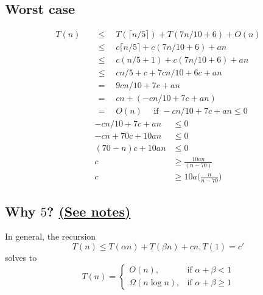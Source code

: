 \documentclass[a4paper]{article}
\begin{document}
\subsection*{Worst case}
    \begin{align*}
        T(n)\quad&\leq \quad T(\lceil n/5\rceil)+T(7n/10+6)+O(n)\\
        &\leq \quad c\lceil n/5\rceil+c(7n/10+6)+an\\
        &\leq \quad c(n/5+1)+c(7n/10+6)+an\\
        &\leq \quad cn/5+c+7cn/10+6c+an\\
        &=\quad 9cn/10+7c+an\\
        &=\quad cn+(-cn/10+7c+an)\\
        &=\quad O(n)\quad \text{ if }-cn/10+7c+an\leq 0
    \end{align*}
    \begin{align*}
        -cn/10+7c+an&\leq 0\\
        -cn+70c+10an&\leq 0\\
        (70-n)c+10an&\leq 0\\
        c&\geq \frac{10an}{(n-70)}\\
        c&\geq 10a\Big(\frac{n}{n-70}\Big)
    \end{align*}
\subsection*{Why $5$? \href{https://people.eecs.berkeley.edu/~luca/w4231/fall99/slides/l3.pdf}{(See notes)}}
    In general, the recursion
    \begin{equation*}
        T(n)\leq T(\alpha n)+T(\beta n)+cn, T(1)=c'
    \end{equation*}
    solves to
    \begin{equation*}
        T(n)=
        \begin{cases}
        O(n),  & \text{if $\alpha+\beta<1$} \\
        \Omega(n\log{n}), & \text{if $\alpha+\beta\geq1$}
        \end{cases}
    \end{equation*}
\end{document}
